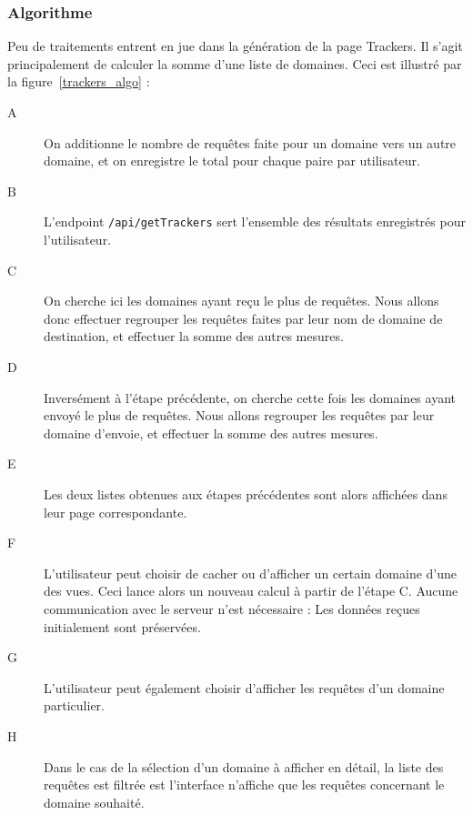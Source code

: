 		\FloatBarrier

		\subsubsection{Algorithme}

			Peu de traitements entrent en jue dans la génération de la page Trackers. Il s'agit principalement de calculer la somme d'une liste de domaines. Ceci est illustré par la figure~\ref{trackers_algo} :
			\begin{description}
				\item[A] On additionne le nombre de requêtes faite pour un domaine vers un autre domaine, et on enregistre le total pour chaque paire par utilisateur.

				\item[B] L'endpoint \texttt{/api/getTrackers} sert l'ensemble des résultats enregistrés pour l'utilisateur.

				\item[C] On cherche ici les domaines ayant reçu le plus de requêtes. Nous allons donc effectuer regrouper les requêtes faites par leur nom de domaine de destination, et effectuer la somme des autres mesures.

				\item[D] Inversément à l'étape précédente, on cherche cette fois les domaines ayant envoyé le plus de requêtes. Nous allons regrouper les requêtes par leur domaine d'envoie, et effectuer la somme des autres mesures.

				\item[E] Les deux listes obtenues aux étapes précédentes sont alors affichées dans leur page correspondante.

				\item[F] L'utilisateur peut choisir de cacher ou d'afficher un certain domaine d'une des vues. Ceci lance alors un nouveau calcul à partir de l'étape C. Aucune communication avec le serveur n'est nécessaire : Les données reçues initialement sont préservées.

				\item[G] L'utilisateur peut également choisir d'afficher les requêtes d'un domaine particulier.

				\item[H] Dans le cas de la sélection d'un domaine à afficher en détail, la liste des requêtes est filtrée est l'interface n'affiche que les requêtes concernant le domaine souhaité.
			\end{description}				


